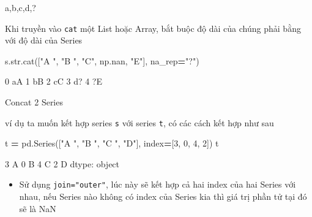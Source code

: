 \documentclass[
]{book}
\newenvironment{Shaded}{\begin{snugshade}}{\end{snugshade}}
\newcommand{\BuiltInTok}[1]{#1}
\newcommand{\DecValTok}[1]{\textcolor[rgb]{0.00,0.00,0.81}{#1}}
\newcommand{\NormalTok}[1]{#1}
\newcommand{\OperatorTok}[1]{\textcolor[rgb]{0.81,0.36,0.00}{\textbf{#1}}}
\newcommand{\StringTok}[1]{\textcolor[rgb]{0.31,0.60,0.02}{#1}}
\providecommand{\tightlist}{%
  \setlength{\itemsep}{0pt}\setlength{\parskip}{0pt}}
\begin{document}
\begin{Shaded}
\begin{Highlighting}[]
\NormalTok{\textquotesingle{}a,b,c,d,?\textquotesingle{}}
\end{Highlighting}
\end{Shaded}

Khi truyền vào \texttt{cat} một List hoặc Array, bắt buộc độ dài của chúng phải bằng với độ dài của Series \hspace{0pt}

\begin{Shaded}
\begin{Highlighting}[]
\NormalTok{s.}\BuiltInTok{str}\NormalTok{.cat([}\StringTok{"A "}\NormalTok{, }\StringTok{"B "}\NormalTok{, }\StringTok{"C"}\NormalTok{, np.nan, }\StringTok{"E"}\NormalTok{], na\_rep}\OperatorTok{=}\StringTok{"?"}\NormalTok{) ​}
\end{Highlighting}
\end{Shaded}

\begin{Shaded}
\begin{Highlighting}[]
\NormalTok{0    aA}
\NormalTok{1    bB}
\NormalTok{2    cC}
\NormalTok{3    d?}
\NormalTok{4    ?E}
\end{Highlighting}
\end{Shaded}

Concat 2 Series

ví dụ ta muốn kết hợp series \texttt{s} với series \texttt{t}, có các cách kết hợp như sau

\begin{Shaded}
\begin{Highlighting}[]
\NormalTok{t }\OperatorTok{=}\NormalTok{ pd.Series([}\StringTok{"A "}\NormalTok{, }\StringTok{"B "}\NormalTok{, }\StringTok{"C "}\NormalTok{, }\StringTok{"D"}\NormalTok{], index}\OperatorTok{=}\NormalTok{[}\DecValTok{3}\NormalTok{, }\DecValTok{0}\NormalTok{, }\DecValTok{4}\NormalTok{, }\DecValTok{2}\NormalTok{])}
\NormalTok{t​}
\end{Highlighting}
\end{Shaded}

\begin{Shaded}
\begin{Highlighting}[]
\NormalTok{3    A}
\NormalTok{0    B}
\NormalTok{4    C}
\NormalTok{2    D}
\NormalTok{dtype: object}
\end{Highlighting}
\end{Shaded}

\begin{itemize}
\tightlist
\item
  Sử dụng \texttt{join="outer"}, lúc này sẽ kết hợp cả hai index của hai Series với nhau, nếu Series nào không có index của Series kia thì giá trị phần tử tại đó sẽ là NaN
\end{itemize}
\end{document}
